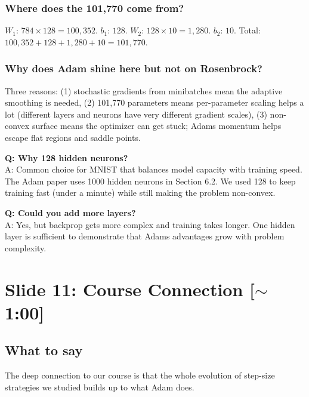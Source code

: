 \documentclass[11pt, letterpaper]{article}
\begin{document}
\begin{deepdive}
\subsubsection{Where does the 101,770 come from?}
$W_1$: $784 \times 128 = 100{,}352$. $b_1$: $128$. $W_2$: $128 \times 10 = 1{,}280$. $b_2$: $10$. Total: $100{,}352 + 128 + 1{,}280 + 10 = 101{,}770$.

\subsubsection{Why does Adam shine here but not on Rosenbrock?}
Three reasons: (1) stochastic gradients from minibatches mean the adaptive smoothing is needed, (2) 101,770 parameters means per-parameter scaling helps a lot (different layers and neurons have very different gradient scales), (3) non-convex surface means the optimizer can get stuck; Adams momentum helps escape flat regions and saddle points.
\end{deepdive}

\begin{qabox}
\textbf{Q: Why 128 hidden neurons?}\\
A: Common choice for MNIST that balances model capacity with training speed. The Adam paper uses 1000 hidden neurons in Section 6.2. We used 128 to keep training fast (under a minute) while still making the problem non-convex.

\textbf{Q: Could you add more layers?}\\
A: Yes, but backprop gets more complex and training takes longer. One hidden layer is sufficient to demonstrate that Adams advantages grow with problem complexity.
\end{qabox}


\section{Slide 11: Course Connection \textnormal{\color{muted}[$\sim$1:00]}}

\subsection{What to say}

The deep connection to our course is that the whole evolution of step-size strategies we studied builds up to what Adam does.
\end{document}
